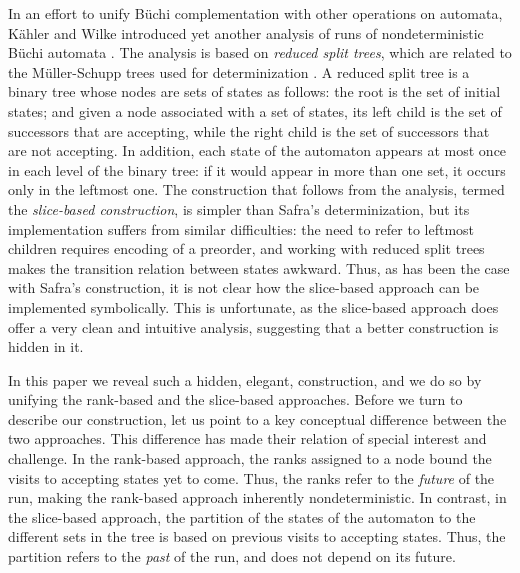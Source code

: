 \documentclass{LMCS}
\newcommand\kahler{K\"ahler\xspace}
\newcommand\buchi{B\"uchi\xspace}
\begin{document}
In an effort to unify \buchi complementation with other operations on automata,  \kahler and Wilke
introduced yet another analysis of runs of nondeterministic B\"uchi automata \cite{KW08}. The
analysis is based on {\em reduced split trees}, which are related to the M\"uller-Schupp trees used
for determinization \cite{MS95}.  A reduced split tree is a binary tree whose nodes are sets of
states as follows: the root is the set of initial states; and given a node associated with a set of
states, its left child is the set of successors that are accepting, while the right child is the set
of successors that are not accepting. In addition, each state of the automaton appears at most once
in each level of the binary tree: if it would appear in more than one set, it occurs only in the
leftmost one.  The construction that follows from the analysis, termed the {\em slice-based
construction\/},  is simpler than Safra's determinization, but its implementation suffers from
similar  difficulties: the need to refer to leftmost children requires encoding of a preorder, and
working with reduced split trees makes the transition relation between states awkward.  Thus,
as has been the case with Safra's construction, it is not clear how the slice-based approach can be
implemented symbolically.  This is unfortunate, as the slice-based approach does offer a very clean
and intuitive analysis, suggesting that a better construction is hidden in it.

In this paper we reveal such a hidden, elegant, construction, and we do so by unifying the
rank-based and the slice-based approaches. Before we turn to describe our construction, let us point
to a key conceptual difference between the two approaches. This difference has made their relation
of special interest and challenge.  In the rank-based approach, the ranks assigned to a node bound
the visits to accepting states yet to come. Thus, the ranks refer to the {\em future\/} of the run,
making the rank-based approach inherently nondeterministic. In contrast, in the slice-based
approach, the partition of the states of the automaton to the different sets in the tree is based on
previous visits to accepting states. Thus, the partition refers to the {\em past\/} of the run, and
does not depend on its future.
\end{document}
